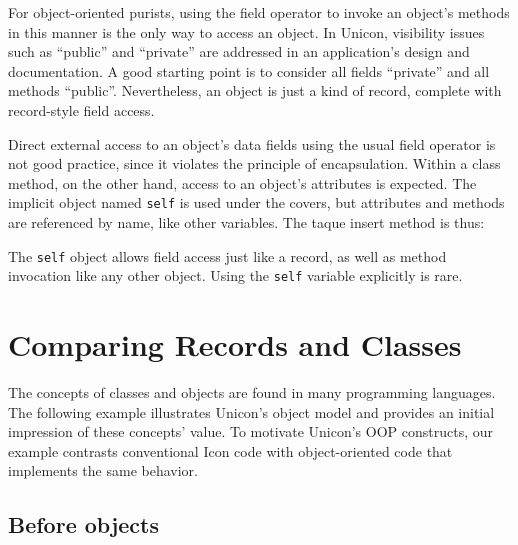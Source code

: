 
For object-oriented purists, using the field operator to invoke an
object's methods in this manner is the only way to
access an object. In Unicon, visibility issues such as
``public'' and ``private'' are addressed in an
application's design and documentation. A good
starting point is to consider all fields
``private'' and all methods ``public''. Nevertheless, an object is just a
kind of record, complete with record-style field access.

Direct external access to an object's data fields using
the usual field operator is not good practice, since it violates the
principle of encapsulation. Within a class method, on the other hand,
access to an object's attributes is expected. The
implicit object named \texttt{self} is used under the covers, but
attributes and methods are referenced by name, like other variables.
The taque insert method is thus: 


The \texttt{self} object allows field access just like a record, as well
as method invocation like any other object. Using the \texttt{self}
variable explicitly is rare.

\section{Comparing Records and Classes}

The concepts of classes and objects are found in many programming
languages. The following example illustrates Unicon's object model
and provides an initial impression of these
concepts' value. To motivate Unicon's OOP
constructs, our example contrasts conventional Icon
code with object-oriented code that implements the same behavior.

\subsection*{Before objects}

